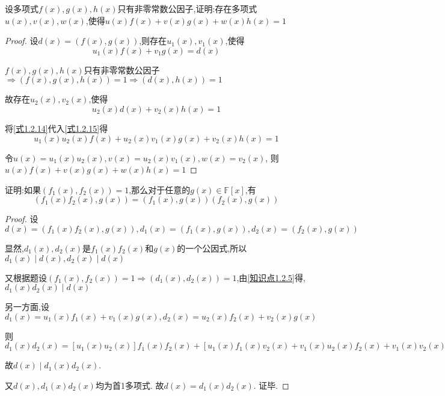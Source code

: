 \begin{example}
    设多项式$f(x),g(x),h(x)$只有非零常数公因子,证明:存在多项式$u(x),v(x),w(x)$,使得$u(x)f(x)+v(x)g(x)+w(x)h(x)=1$
\end{example}

\begin{proof}
    
    设$d(x)=(f(x),g(x))$,则存在$u_1(x),v_1(x)$,使得
    \begin{equation}\label{式1.2.14}
        u_1(x)f(x)+v_1g(x)=d(x)
    \end{equation}

    $f(x),g(x),h(x)$只有非零常数公因子$\Longrightarrow (f(x),g(x),h(x))=1 \Longrightarrow (d(x),h(x))=1$

    故存在$u_2(x),v_2(x)$,使得
    \begin{equation}\label{式1.2.15}
        u_2(x)d(x)+v_2(x)h(x)=1
    \end{equation}

    将\cref{式1.2.14}代入\cref{式1.2.15}得
    $$u_1(x)u_2(x)f(x)+u_2(x)v_1(x)g(x)+v_2(x)h(x)=1$$

    令$u(x)=u_1(x)u_2(x),v(x)=u_2(x)v_1(x),w(x)=v_2(x)$,
    则$u(x)f(x)+v(x)g(x)+w(x)h(x)=1$
\end{proof}

\begin{example}
    证明:如果$(f_1(x),f_2(x))=1$,那么对于任意的$g(x)\in \mathbb{F}[x]$,有
    $$(f_1(x)f_2(x),g(x))=(f_1(x),g(x))(f_2(x),g(x))$$
\end{example}

\begin{proof}
    
    设$d(x)=(f_1(x)f_2(x),g(x)),d_1(x)=(f_1(x),g(x)),d_2(x)=(f_2(x),g(x))$

    显然,$d_1(x),d_2(x)$是$f_1(x)f_2(x)$和$g(x)$的一个公因式,所以$d_1(x)\mid d(x),d_2(x)\mid d(x)$

    又根据题设$(f_1(x),f_2(x))=1\Longrightarrow (d_1(x),d_2(x))=1$,由\cref{知识点1.2.5}得,$d_1(x)d_2(x)\mid d(x)$

    另一方面,设$d_1(x)=u_1(x)f_1(x)+v_1(x)g(x),d_2(x)=u_2(x)f_2(x)+v_2(x)g(x)$

    则$d_1(x)d_2(x)=[u_1(x)u_2(x)]f_1(x)f_2(x)+[u_1(x)f_1(x)v_2(x)+v_1(x)u_2(x)f_2(x)+v_1(x)v_2(x)g(x)]g(x)$

    故$d(x)\mid d_1(x)d_2(x)$.

    又$d(x),d_1(x)d_2(x)$均为首1多项式. 故$d(x)=d_1(x)d_2(x)$. 证毕. 
\end{proof}

